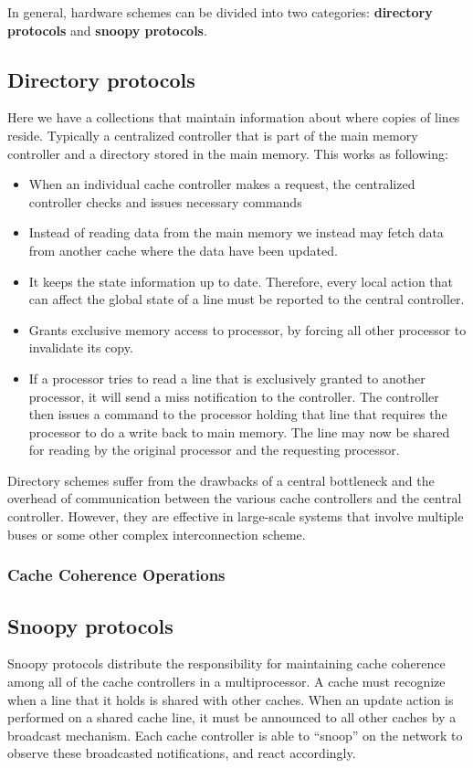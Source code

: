 In general, hardware schemes can be divided into two categories: \textbf{directory protocols} and \textbf{snoopy protocols}.

\subsection{Directory protocols}
Here we have a collections that maintain information about where copies of lines reside. Typically a centralized controller that is part of the main memory controller and a directory stored in the main memory. This works as following:

\begin{itemize}
\item When an individual cache controller makes a request, the centralized controller checks and issues necessary commands
\item Instead of reading data from the main memory we instead may fetch data from another cache where the data have been updated.
\item It keeps the state information up to date. Therefore, every local action that can affect the global state of a line must be reported to the central controller.
\item Grants exclusive memory access to processor, by forcing all other processor to invalidate its copy.
\item If a processor tries to read a line that is exclusively granted to another processor, it will send a miss notification to the controller. The controller then issues a command to the processor holding that line that requires the processor to do a write back to main memory. The line may now be shared for reading by the original processor and the requesting processor.
\end{itemize}

Directory schemes suffer from the drawbacks of a central bottleneck and the overhead of communication between the various cache controllers and the central controller. However, they are effective in large-scale systems that involve multiple buses or some other complex interconnection scheme.
\subsubsection{Cache Coherence Operations}
\subsection{Snoopy protocols}
Snoopy protocols distribute the responsibility for maintaining cache coherence among all of the cache controllers in a multiprocessor. A cache must recognize when a line that it holds is shared with other caches. When an update action is performed on a shared cache line, it must be announced to all other caches by a broadcast mechanism. Each cache controller is able to “snoop” on the network to observe these broadcasted notifications, and react accordingly.

